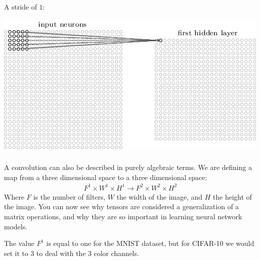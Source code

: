 \documentclass[xetex,mathserif,serif,aspectratio=169]{beamer}
\begin{document}
\begin{frame}[fragile] \frametitle{} \oldB \small

A stride of $1$:

\begin{center}
\includegraphics[height=0.7\textheight]{img/tikz45.png}
\end{center}

\end{frame}

\begin{frame}[fragile] \frametitle{} \oldB \small

\textbf{}

A convolution can also be described in purely algebraic
terms. We are defining a map from a three dimensional space
to a three dimensional space:
\begin{align*}
F^1 \times W^1 \times H^1 \rightarrow F^2 \times W^2 \times H^2
\end{align*}
Where $F$ is the number of filters, $W$ the width of the image,
and $H$ the height of the image. You can now see why tensors are
considered a generalization of a matrix operations, and why they
are so important in learning neural network models.

\pause The value $F^1$ is equal to one for the MNIST dataset, but
for CIFAR-10 we would set it to $3$ to deal with the $3$ color
channels.

\end{frame}
\end{document}
